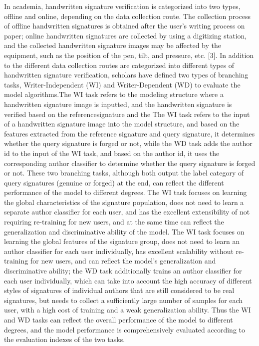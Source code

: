 In academia, handwritten signature verification is categorized into two types, offline and online, depending on the data collection route. The collection process of offline handwritten signatures is obtained after the user's writing process on paper; online handwritten signatures are collected by using a digitizing station, and the collected handwritten signature images may be affected by the equipment, such as the position of the pen, tilt, and pressure, etc. [3]. In addition to the different data collection routes are categorized into different types of handwritten signature verification, scholars have defined two types of branching tasks, Writer-Independent (WI) and Writer-Dependent (WD) to evaluate the model algorithms.The WI task refers to the modeling structure where a handwritten signature image is inputted, and the handwritten signature is verified based on the referencesignature and the The WI task refers to the input of a handwritten signature image into the model structure, and based on the features extracted from the reference signature and query signature, it determines whether the query signature is forged or not, while the WD task adds the author id to the input of the WI task, and based on the author id, it uses the corresponding author classifier to determine whether the query signature is forged or not. These two branching tasks, although both output the label category of query signatures (genuine or forged) at the end, can reflect the different performance of the model to different degrees. The WI task focuses on learning the global characteristics of the signature population, does not need to learn a separate author classifier for each user, and has the excellent extensibility of not requiring re-training for new users, and at the same time can reflect the generalization and discriminative ability of the model. The WI task focuses on learning the global features of the signature group, does not need to learn an author classifier for each user individually, has excellent scalability without re-training for new users, and can reflect the model's generalization and discriminative ability; the WD task additionally trains an author classifier for each user individually, which can take into account the high accuracy of different styles of signatures of individual authors that are still considered to be real signatures, but needs to collect a sufficiently large number of samples for each user, with a high cost of training and a weak generalization ability. Thus the WI and WD tasks can reflect the overall performance of the model to different degrees, and the model performance is comprehensively evaluated according to the evaluation indexes of the two tasks.

